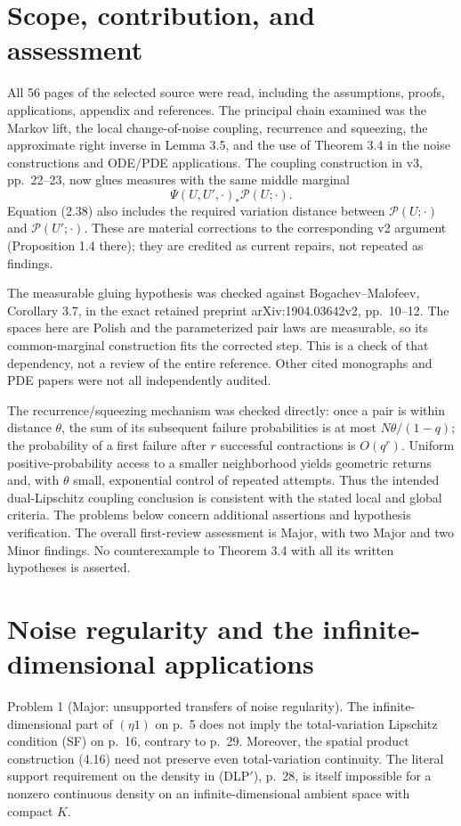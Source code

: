 \documentclass[10pt]{article}
\begin{document}
\section*{Scope, contribution, and assessment}
All 56 pages of the selected source were read, including the assumptions, proofs, applications, appendix and references. The principal chain examined was the Markov lift, the local change-of-noise coupling, recurrence and squeezing, the approximate right inverse in Lemma 3.5, and the use of Theorem 3.4 in the noise constructions and ODE/PDE applications. The coupling construction in v3, pp. 22–23, now glues measures with the same middle marginal \[\Psi(U,U',\cdot)_*\mathcal P(U;\cdot).\] Equation (2.38) also includes the required variation distance between \(\mathcal P(U;\cdot)\) and \(\mathcal P(U';\cdot)\). These are material corrections to the corresponding v2 argument (Proposition 1.4 there); they are credited as current repairs, not repeated as findings.\par
The measurable gluing hypothesis was checked against Bogachev–Malofeev, Corollary 3.7, in the exact retained preprint arXiv:1904.03642v2, pp. 10–12. The spaces here are Polish and the parameterized pair laws are measurable, so its common-marginal construction fits the corrected step. This is a check of that dependency, not a review of the entire reference. Other cited monographs and PDE papers were not all independently audited.\par
The recurrence/squeezing mechanism was checked directly: once a pair is within distance \(\theta\), the sum of its subsequent failure probabilities is at most \(N\theta/(1-q)\); the probability of a first failure after \(r\) successful contractions is \(O(q^r)\). Uniform positive-probability access to a smaller neighborhood yields geometric returns and, with \(\theta\) small, exponential control of repeated attempts. Thus the intended dual-Lipschitz coupling conclusion is consistent with the stated local and global criteria. The problems below concern additional assertions and hypothesis verification. The overall first-review assessment is Major, with two Major and two Minor findings. No counterexample to Theorem 3.4 with all its written hypotheses is asserted.\par
\section*{Noise regularity and the infinite-dimensional applications}
Problem 1 (Major: unsupported transfers of noise regularity).  The infinite-dimensional part of \((\eta1)\) on p. 5 does not imply the total-variation Lipschitz condition (SF) on p. 16, contrary to p. 29. Moreover, the spatial product construction (4.16) need not preserve even total-variation continuity. The literal support requirement on the density in (DLP\('\)), p. 28, is itself impossible for a nonzero continuous density on an infinite-dimensional ambient space with compact \(K\).\par
\end{document}

